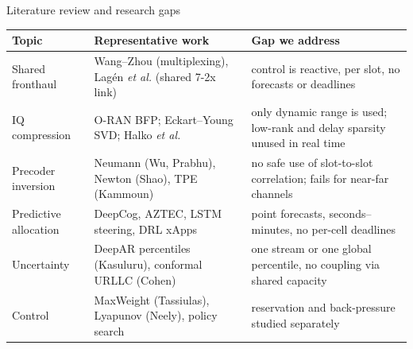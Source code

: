 \documentclass[aspectratio=169,11pt]{beamer}
\begin{document}
\begin{frame}{Literature review and research gaps}
\footnotesize
\renewcommand{\arraystretch}{1.2}
\begin{tabular}{>{\raggedright\arraybackslash}p{2.6cm}>{\raggedright\arraybackslash}p{5.4cm}>{\raggedright\arraybackslash}p{5.6cm}}
\toprule
Topic & Representative work & Gap we address \\
\midrule
Shared fronthaul & Wang--Zhou (multiplexing), Lag\'en \emph{et al.} (shared 7-2x link) & control is reactive, per slot, no forecasts or deadlines \\
IQ compression & O-RAN BFP; Eckart--Young SVD; Halko \emph{et al.} & only dynamic range is used; low-rank and delay sparsity unused in real time \\
Precoder inversion & Neumann (Wu, Prabhu), Newton (Shao), TPE (Kammoun) & no safe use of slot-to-slot correlation; fails for near-far channels \\
Predictive allocation & DeepCog, AZTEC, LSTM steering, DRL xApps & point forecasts, seconds--minutes, no per-cell deadlines \\
Uncertainty & DeepAR percentiles (Kasuluru), conformal URLLC (Cohen) & one stream or one global percentile, no coupling via shared capacity \\
Control & MaxWeight (Tassiulas), Lyapunov (Neely), policy search & reservation and back-pressure studied separately \\
\bottomrule
\end{tabular}
\end{frame}
\end{document}
